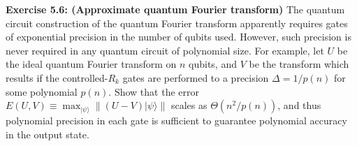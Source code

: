 \begin{exercise}
\textbf{Exercise 5.6: (Approximate quantum Fourier transform)} The quantum circuit construction of the quantum Fourier transform apparently requires gates of exponential precision in the number of qubits used. However, such precision is never required in any quantum circuit of polynomial size. For example, let $U$ be the ideal quantum Fourier transform on $n$ qubits, and $V$ be the transform which results if the controlled-$R_{k}$ gates are performed to a precision $\Delta=1 / p(n)$ for some polynomial $p(n)$. Show that the error $E(U, V) \equiv \max _{|\psi\rangle} \|(U-V)|\psi\rangle \|$ scales as $\Theta\left(n^{2} / p(n)\right)$, and thus polynomial precision in each gate is sufficient to guarantee polynomial accuracy in the output state.
\end{exercise}

